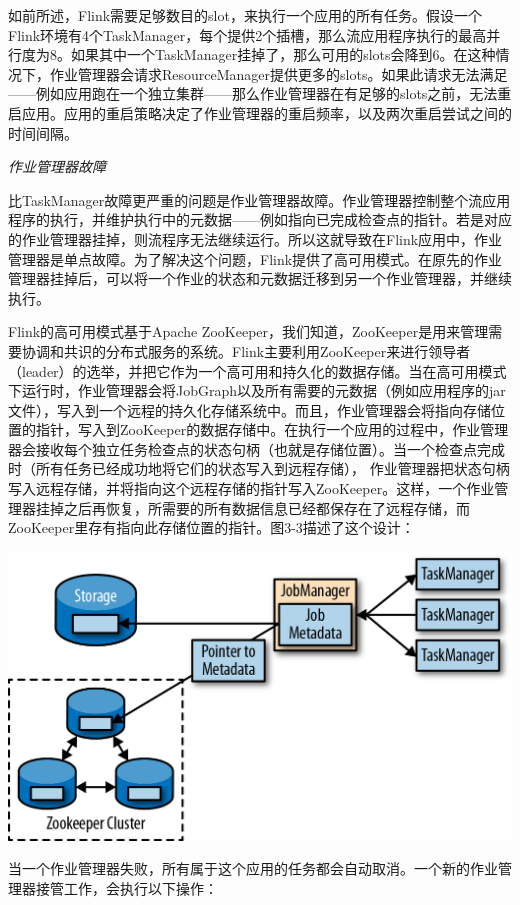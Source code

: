 \documentclass[cn,11pt,chinese]{elegantbook}
\begin{document}
如前所述，Flink需要足够数目的slot，来执行一个应用的所有任务。假设一个Flink环境有4个TaskManager，每个提供2个插槽，那么流应用程序执行的最高并行度为8。如果其中一个TaskManager挂掉了，那么可用的slots会降到6。在这种情况下，作业管理器会请求ResourceManager提供更多的slots。如果此请求无法满足------例如应用跑在一个独立集群------那么作业管理器在有足够的slots之前，无法重启应用。应用的重启策略决定了作业管理器的重启频率，以及两次重启尝试之间的时间间隔。

\emph{作业管理器故障}

比TaskManager故障更严重的问题是作业管理器故障。作业管理器控制整个流应用程序的执行，并维护执行中的元数据------例如指向已完成检查点的指针。若是对应的作业管理器挂掉，则流程序无法继续运行。所以这就导致在Flink应用中，作业管理器是单点故障。为了解决这个问题，Flink提供了高可用模式。在原先的作业管理器挂掉后，可以将一个作业的状态和元数据迁移到另一个作业管理器，并继续执行。

Flink的高可用模式基于Apache
ZooKeeper，我们知道，ZooKeeper是用来管理需要协调和共识的分布式服务的系统。Flink主要利用ZooKeeper来进行领导者（leader）的选举，并把它作为一个高可用和持久化的数据存储。当在高可用模式下运行时，作业管理器会将JobGraph以及所有需要的元数据（例如应用程序的jar文件），写入到一个远程的持久化存储系统中。而且，作业管理器会将指向存储位置的指针，写入到ZooKeeper的数据存储中。在执行一个应用的过程中，作业管理器会接收每个独立任务检查点的状态句柄（也就是存储位置）。当一个检查点完成时（所有任务已经成功地将它们的状态写入到远程存储），
作业管理器把状态句柄写入远程存储，并将指向这个远程存储的指针写入ZooKeeper。这样，一个作业管理器挂掉之后再恢复，所需要的所有数据信息已经都保存在了远程存储，而ZooKeeper里存有指向此存储位置的指针。图3-3描述了这个设计：

\includegraphics{images/spaf_0303.png}

当一个作业管理器失败，所有属于这个应用的任务都会自动取消。一个新的作业管理器接管工作，会执行以下操作：
\end{document}
